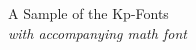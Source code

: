 \documentclass[11pt]{article}
\begin{document}
{\LARGE \noindent A Sample of the Kp-Fonts}\\

{\large \noindent \textit{with accompanying math font}}\\[5pt]


\end{document}
